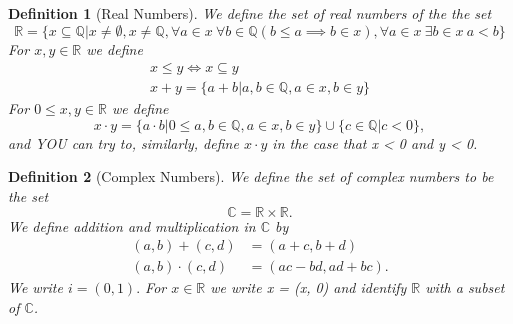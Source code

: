\documentclass[11pt, oneside]{book}
\theoremstyle{break}
\newtheorem{defn}{Definition}[section]
\newcommand{\bb}[1]{\mathbb{#1}}		%
\begin{document}
\begin{defn}[Real Numbers]
	We define the set of real numbers of the the set
	\[
		\bb{R} = \{x \subseteq \bb{Q} | x \neq \emptyset, x \neq \bb{Q}, \forall a \in x \> \forall b \in \bb{Q}(b \leq a \implies b \in x), \forall a \in x \> \exists b \in x \> a < b \}
	\]
	For $x, y \in \bb{R}$ we define
	\begin{gather*}
		x \leq y \iff x \subseteq y \\
		x + y = \{ a + b | a, b \in \bb{Q}, a \in x, b \in y\}
	\end{gather*}
	For $0 \leq x, y \in \bb{R}$ we define
	\[
		x \cdot y = \{ a \cdot b | 0 \leq a, b \in \bb{Q}, a \in x, b \in y\} \cup \{c \in \bb{Q} | c < 0\},
	\]
	and YOU can try to, similarly, define $x \cdot y$ in the case that x < 0 and y < 0.
\end{defn}

\begin{defn}[Complex Numbers]
	We define the set of complex numbers to be the set
	\[
		\bb{C} = \bb{R} \times \bb{R}.
	\]
	We define addition and multiplication in $\bb{C}$ by
	\begin{align*}
		(a, b) + (c, d) &= (a + c, b + d) \\
		(a, b) \cdot (c, d) &= (ac - bd, ad + bc).
	\end{align*}
	We write $i = (0, 1).$ For $x \in \bb{R}$ we write x = (x, 0) and identify $\bb{R}$ with a subset of $\bb{C}$.
\end{defn}
\end{document}
